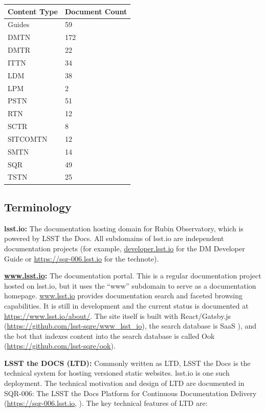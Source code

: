 \begin{longtable}{p{}p{}}\hline
\textbf{Content Type} & \textbf{Document Count}  \\\hline
Guides		& 59 		\\\hline
DMTN 		& 172	\\\hline
DMTR		& 22 		\\\hline
ITTN		& 34 		\\\hline
LDM			& 38 		\\\hline
LPM 		& 2 		\\\hline
PSTN  		& 51  	\\\hline
RTN   		& 12 		\\\hline
SCTR 		& 8 		\\\hline
SITCOMTN	& 12 		\\\hline
SMTN 		& 14		\\\hline
SQR 		& 49 		\\\hline
TSTN 		& 25          \\\hline          
\end{longtable}

\subsection{Terminology}

{\bf lsst.io:}  The documentation hosting domain for Rubin Observatory, which is powered by LSST the Docs.
All subdomains of lsst.io are independent documentation projects (for example, \url{developer.lsst.io} for the DM Developer Guide or \url{https://sqr-006.lsst.io} for the  technote).

{\bf \url{www.lsst.io}:}  The documentation portal. This is a regular documentation project hosted on lsst.io, but it uses the ``www'' subdomain to serve as a documentation homepage.
\url{www.lsst.io} provides documentation search and faceted browsing capabilities.
It is still in development and the current status is documented at \url{https://www.lsst.io/about/}.
The site itself is built with React/Gatsby.js (\url{https://github.com/lsst-sqre/www_lsst_io}), the search database is SaaS \citep{SaaS-cite}), and the bot that indexes content into the search database is called Ook (\url{https://github.com/lsst-sqre/ook}).

{\bf LSST the DOCS (LTD):}  Commonly written as LTD, LSST the Docs is the technical system for hosting versioned static websites. lsst.io is one such deployment.
The technical motivation and design of LTD are documented in SQR-006: The LSST the Docs Platform for Continuous Documentation Delivery (\url{https://sqr-006.lsst.io}, ). The key technical features of LTD are:

